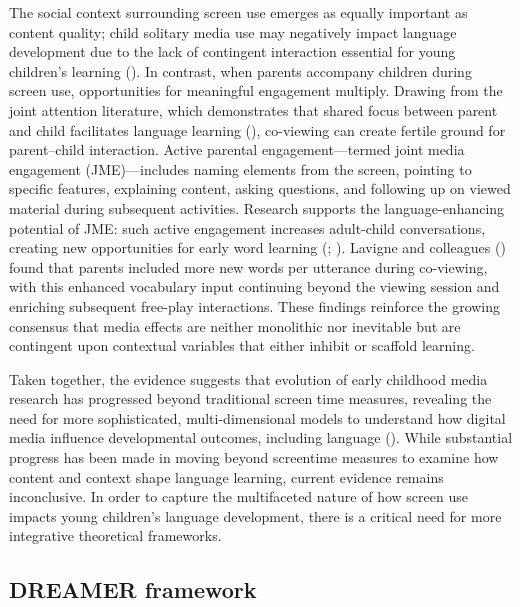 \documentclass[
  man,
  floatsintext,
  longtable,
  nolmodern,
  notxfonts,
  notimes,
  colorlinks=true,linkcolor=blue,citecolor=blue,urlcolor=blue]{apa7}
\begin{document}
The social context surrounding screen use emerges as equally important
as content quality; child solitary media use may negatively impact
language development due to the lack of contingent interaction essential
for young children's learning
(). In contrast, when parents accompany children during screen use,
opportunities for meaningful engagement multiply. Drawing from the joint
attention literature, which demonstrates that shared focus between
parent and child facilitates language learning
(), co-viewing can create fertile ground for parent--child
interaction. Active parental engagement---termed joint media engagement
(JME)---includes naming elements from the screen, pointing to specific
features, explaining content, asking questions, and following up on
viewed material during subsequent activities. Research supports the
language-enhancing potential of JME: such active engagement increases
adult-child conversations, creating new opportunities for early word
learning (; ). Lavigne and colleagues
() found
that parents included more new words per utterance during co-viewing,
with this enhanced vocabulary input continuing beyond the viewing
session and enriching subsequent free-play interactions. These findings
reinforce the growing consensus that media effects are neither
monolithic nor inevitable but are contingent upon contextual variables
that either inhibit or scaffold learning.

Taken together, the evidence suggests that evolution of early childhood
media research has progressed beyond traditional screen time measures,
revealing the need for more sophisticated, multi-dimensional models to
understand how digital media influence developmental outcomes, including
language ().
While substantial progress has been made in moving beyond screentime
measures to examine how content and context shape language learning,
current evidence remains inconclusive. In order to capture the
multifaceted nature of how screen use impacts young children's language
development, there is a critical need for more integrative theoretical
frameworks.

\subsection{DREAMER framework}\label{dreamer-framework}
\end{document}
